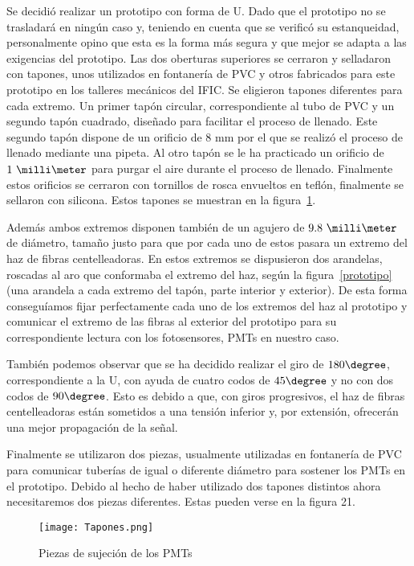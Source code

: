 Se decidió realizar un prototipo con forma de U. Dado que el prototipo no se trasladará en ningún caso y, teniendo en cuenta que se verificó su estanqueidad, personalmente opino que esta es la forma más segura y que mejor se adapta a las exigencias del prototipo. Las dos oberturas superiores se cerraron  y selladaron con tapones, unos utilizados en fontanería de PVC y otros fabricados para este prototipo en los talleres mecánicos del IFIC. Se eligieron tapones diferentes para cada extremo. Un primer tapón circular,  correspondiente al tubo de PVC y un segundo tapón cuadrado, diseñado para facilitar el proceso de llenado. Este segundo tapón dispone de  un orificio de 8 mm por el que se realizó el proceso de llenado  mediante una pipeta. Al otro tapón  se le ha practicado  un orificio de $1~\milli\meter$ para purgar el aire durante el  proceso de llenado. Finalmente estos orificios se cerraron con  tornillos de rosca envueltos en teflón, finalmente se sellaron con silicona. Estos tapones se muestran en la figura~\ref{tapones}.

Además ambos extremos disponen también de un agujero de $9.8~\milli\meter$ de diámetro, tamaño justo para que por cada uno de estos pasara un extremo del haz de fibras centelleadoras. En estos extremos se dispusieron dos arandelas, roscadas al aro que conformaba el extremo del haz, según la figura~\ref{prototipo} (una arandela a cada extremo del tapón, parte interior y exterior). De esta forma conseguíamos fijar perfectamente cada uno de los extremos del haz al prototipo y comunicar el extremo de las fibras al exterior del prototipo para su correspondiente lectura con los fotosensores, PMTs en nuestro caso. 



También podemos observar que se ha decidido realizar el giro de $180\degree$, correspondiente a la U, con ayuda de cuatro codos de $45\degree$ y no con dos codos de $90\degree$. Esto es debido a que, con giros progresivos, el haz de fibras centelleadoras están sometidos a una tensión inferior y, por extensión, ofrecerán una mejor propagación de la señal.

Finalmente se utilizaron dos piezas, usualmente utilizadas en fontanería de PVC para comunicar tuberías de igual o diferente diámetro para sostener los PMTs en el prototipo. Debido al hecho de haber utilizado dos tapones distintos ahora necesitaremos dos piezas diferentes. Estas pueden verse en la figura 21.

\begin{figure}[hbtp]
\centering
\texttt{[image: Tapones.png]}\\
\caption{ Piezas de sujeción de los PMTs\label{tapones}
}
\end{figure}


